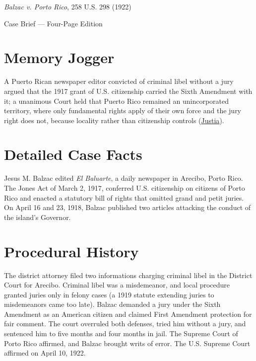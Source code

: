 \documentclass[12pt]{article}
\begin{document}
\begin{center}
{\LARGE \textit{Balzac v. Porto Rico}, 258 U.S. 298 (1922)\par}
\vspace{0.8em}
{\large Case Brief --- Four-Page Edition\par}
\end{center}
\vspace{1em}

\section{Memory Jogger}

A Puerto Rican newspaper editor convicted of criminal libel without a jury argued that the 1917 grant of U.S. citizenship carried the Sixth Amendment with it; a unanimous Court held that Puerto Rico remained an unincorporated territory, where only fundamental rights apply of their own force and the jury right does not, because locality rather than citizenship controls (\href{https://supreme.justia.com/cases/federal/us/258/298/}{Justia}).

\section{Detailed Case Facts}

Jesus M. Balzac edited \textit{El Baluarte}, a daily newspaper in Arecibo, Porto Rico. The Jones Act of March 2, 1917, conferred U.S. citizenship on citizens of Porto Rico and enacted a statutory bill of rights that omitted grand and petit juries. On April 16 and 23, 1918, Balzac published two articles attacking the conduct of the island's Governor.

\section{Procedural History}

The district attorney filed two informations charging criminal libel in the District Court for Arecibo. Criminal libel was a misdemeanor, and local procedure granted juries only in felony cases (a 1919 statute extending juries to misdemeanors came too late). Balzac demanded a jury under the Sixth Amendment as an American citizen and claimed First Amendment protection for fair comment. The court overruled both defenses, tried him without a jury, and sentenced him to five months and four months in jail. The Supreme Court of Porto Rico affirmed, and Balzac brought writs of error. The U.S. Supreme Court affirmed on April 10, 1922.
\end{document}
